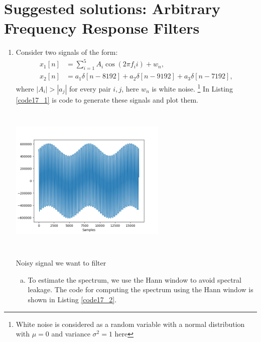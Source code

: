 
\newpage
\section{Suggested solutions: Arbitrary Frequency Response Filters}
\begin{enumerate}
    \item Consider two signals of the form:
          \begin{align*}
              x_{1}[n] & =\sum_{i=1}^{5}A_{i}\cos(2\pi f_{i}i) + w_{n},              \\
              x_{2}[n] & =a_1\delta[n-8192] + a_2\delta[n-9192] + a_3\delta[n-7192],
          \end{align*}
          where $|A_{i}|>|a_{j}|$ for every pair $i, j$, here $w_n$ is white noise.
          \footnote{White noise is considered as a random variable with a normal distribution
              with $\mu=0$ and variance $\sigma^{2}=1$ here} In Listing \ref{code17_1} is code to generate these signals and plot them.

          

          \begin{marginfigure}
              \centering
              \includegraphics[width=7.5cm, height=7.2cm]{ch17/figures/ex17_1.png}
              \caption{Noisy signal we want to filter}
              \label{fig17_1}
          \end{marginfigure}

          \begin{enumerate}[a)]
              \item To estimate the spectrum, we use the Hann window to avoid spectral leakage.
                    The code for computing the spectrum using the Hann window is shown in Listing \ref{code17_2}.


\end{enumerate}
\end{enumerate}
